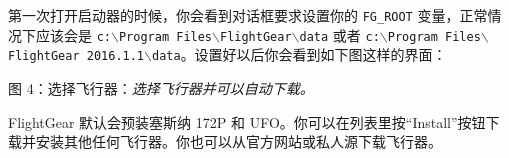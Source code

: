 \medskip
第一次打开启动器的时候，你会看到对话框要求设置你的 \texttt{FG\_ROOT} 变量，正常情况下应该会是 \texttt{c:$\backslash$Program Files$\backslash$FlightGear$\backslash$data} 或者
\texttt{c:$\backslash$Program Files$\backslash$FlightGear 2016.1.1$\backslash$data}。设置好以后你会看到如下图这样的界面：

\medskip
\centerline{}
\smallskip
\noindent
图 4：选择飞行器：\textit{选择飞行器并可以自动下载。}
\medskip

FlightGear 默认会预装塞斯纳 172P 和 UFO。你可以在列表里按“Install”按钮下载并安装其他任何飞行器。你也可以从官方网站或私人源下载飞行器。


